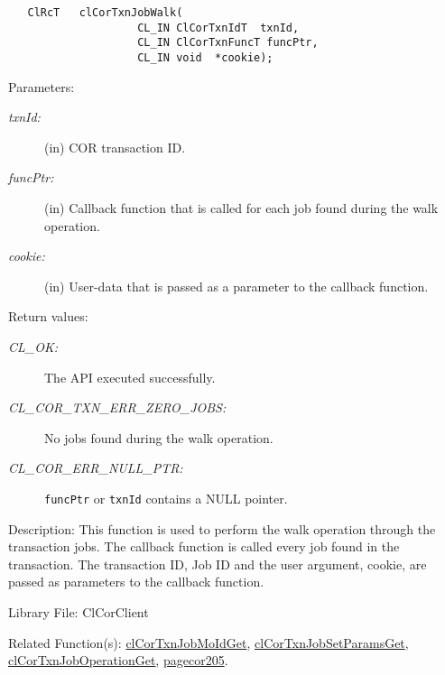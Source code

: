 \begin{flushleft}
\begin{Desc}
\footnotesize\begin{verbatim}   ClRcT   clCorTxnJobWalk(
					CL_IN ClCorTxnIdT  txnId,
					CL_IN ClCorTxnFuncT funcPtr,
					CL_IN void  *cookie);

\end{verbatim}
\normalsize
\end{Desc}
\begin{Desc}
\item[Parameters:]
\begin{description}
\item[{\em txn\-Id:}](in) COR transaction ID.
\item[{\em func\-Ptr:}](in) Callback function that is called for each job found during the walk operation.
\item[{\em *cookie:}](in) User-data that is passed as a parameter to the callback function.
\end{description}
\end{Desc}
\begin{Desc}
\item[Return values:]
\begin{description}
\item[{\em CL\_\-OK:}]The API executed successfully. 
\item[{\em CL\_\-COR\_\-TXN\_\-ERR\_\-ZERO\_\-JOBS:}] No jobs found during the walk operation.
\item[{\em CL\_\-COR\_\-ERR\_\-NULL\_\-PTR:}] {\tt{funcPtr}} or {\tt{txnId}} contains a NULL pointer.
\end{description}
\end{Desc}
\begin{Desc}
\item[Description:] This function is used to perform the walk operation through the transaction jobs. The callback function is called every job 
found in the transaction. The transaction ID, Job ID and the user argument, cookie, are passed as parameters to the callback function. 
\end{Desc}
\begin{Desc}
\item[Library File:]Cl\-Cor\-Client\end{Desc}
\begin{Desc}
\item[Related Function(s):]\hyperlink{pagecor202}{clCorTxnJobMoIdGet}, \hyperlink{pagecor203}{clCorTxnJobSetParamsGet}, 
\hyperlink{pagecor204}{clCorTxnJobOperationGet}, \hyperlink{pagecor150}{pagecor205}.
\end{Desc} 	
\newpage




\end{flushleft}

